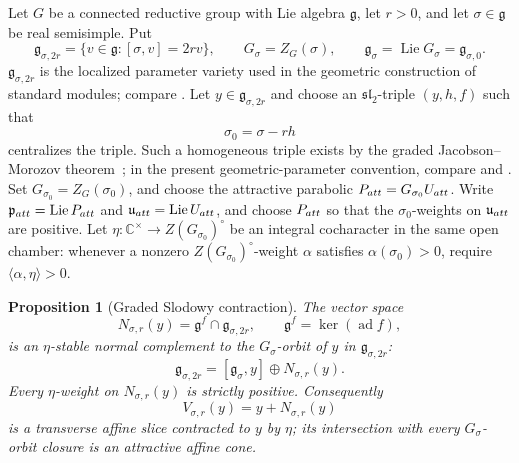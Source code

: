 \documentclass[10pt,a4paper]{amsart}
\newtheorem{proposition}[theorem]{Proposition}
\begin{document}
Let $G$ be a connected reductive group with Lie algebra $\mathfrak g$, let
$r>0$, and let $\sigma\in\mathfrak g$ be real semisimple.  Put
\[
 \mathfrak g_{\sigma,2r}=\{v\in\mathfrak g:[\sigma,v]=2rv\},
 \qquad G_\sigma=Z_G(\sigma),\qquad
 \mathfrak g_\sigma=\operatorname{Lie}G_\sigma=\mathfrak g_{\sigma,0}.
\]
$\mathfrak g_{\sigma,2r}$ is the localized parameter variety used in the geometric construction
of standard modules; compare \cite[Sections~2--4]{Solleveld}.  Let
$y\in\mathfrak g_{\sigma,2r}$ and choose an $\mathfrak{sl}_2$-triple
$(y,h,f)$ such that
\[
 \sigma_0=\sigma-rh
\]
centralizes the triple.  Such a homogeneous triple exists by the graded
Jacobson--Morozov theorem~\cite[Theorem~1]{Vinberg}; in the present
geometric-parameter convention, compare
\cite[equation~(26) and Proposition~3.5(c)]{AMS} and
\cite[equation~(3.6) and Lemma~B.3]{Solleveld}.  Set
$G_{\sigma_0}=Z_G(\sigma_0)$, and choose the attractive
parabolic $P_{\rm att}=G_{\sigma_0} U_{\rm att}$.  Write
$\mathfrak p_{\rm att}=\operatorname{Lie}P_{\rm att}$ and
$\mathfrak u_{\rm att}=\operatorname{Lie}U_{\rm att}$, and choose
$P_{\rm att}$ so that the $\sigma_0$-weights on
$\mathfrak u_{\rm att}$ are positive.
Let $\eta:\mathbb C^\times\to Z(G_{\sigma_0})^\circ$ be an integral cocharacter in the
same open chamber: whenever a nonzero $Z(G_{\sigma_0})^\circ$-weight $\alpha$ satisfies
$\alpha(\sigma_0)>0$, require $\langle\alpha,\eta\rangle>0$.

\begin{proposition}[Graded Slodowy contraction]
\label{prop:general-graded-slodowy}
The vector space
\[
N_{\sigma,r}(y)=\mathfrak g^f\cap\mathfrak g_{\sigma,2r},
\qquad \mathfrak g^f=\ker(\operatorname{ad}f),
\]
is an $\eta$-stable normal complement to the $G_\sigma$-orbit of $y$ in
$\mathfrak g_{\sigma,2r}$:
\begin{equation}\label{eq:general-slodowy-splitting}
 \mathfrak g_{\sigma,2r}
 =[\mathfrak g_\sigma,y]\oplus N_{\sigma,r}(y).
\end{equation}
Every $\eta$-weight on $N_{\sigma,r}(y)$ is strictly positive.  Consequently
\[
 V_{\sigma,r}(y)=y+N_{\sigma,r}(y)
\]
is a transverse affine slice contracted to $y$ by $\eta$; its intersection
with every $G_\sigma$-orbit closure is an attractive affine cone.
\end{proposition}
\end{document}
